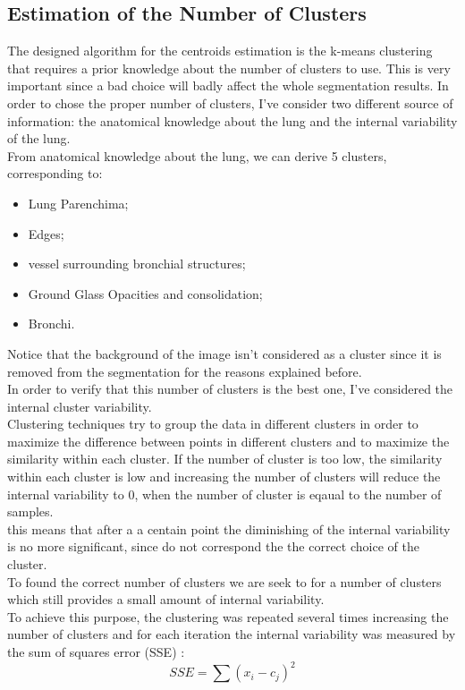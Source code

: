 \documentclass{standalone}
\begin{document}
	\subsection{Estimation of the Number of Clusters}
	
	The designed algorithm for the centroids estimation is the k-means clustering that requires a prior knowledge about the number of clusters to use. This is very important since a bad choice will badly affect the whole segmentation results. In order to chose the proper number of clusters, I've consider two different source of information: the anatomical knowledge about the lung and the internal variability of the lung. \\
	From anatomical knowledge about the lung, we can derive 5 clusters, corresponding to: 
	
	\begin{itemize}
		\item Lung Parenchima; 
		
		\item  Edges;
		
		\item vessel surrounding bronchial structures;
		
		\item  Ground Glass Opacities and consolidation;
		
		\item Bronchi.
	\end{itemize}

	Notice that the background of the image isn't considered as a cluster since it is removed from the segmentation for the reasons explained before.\\
	In order to verify that this number of clusters is the best one, I've considered the internal cluster variability.\\
	Clustering techniques try to group the data in different clusters  in order to maximize the difference between points in different clusters and to maximize the similarity within each cluster.  If the number of cluster is too low, the similarity within each cluster is low and increasing the number of clusters will reduce the internal variability to $0$, when the number of cluster is eqaual to the number of samples.\\ this means that after a a centain point the diminishing of the internal variability is no more significant, since do not correspond the the correct choice of the cluster.\\
	To found the correct number of clusters we are seek to for a number of clusters which still provides a small amount of internal variability. \\
	To achieve this purpose, the clustering was repeated several times increasing the number of clusters and for each iteration the internal variability was measured by the sum of squares error (SSE) : 
	\begin{equation}\label{eq:SumOfSquare}
		SSE = \sum (x_i - c_j)^2
	\end{equation}
	
\end{document}
